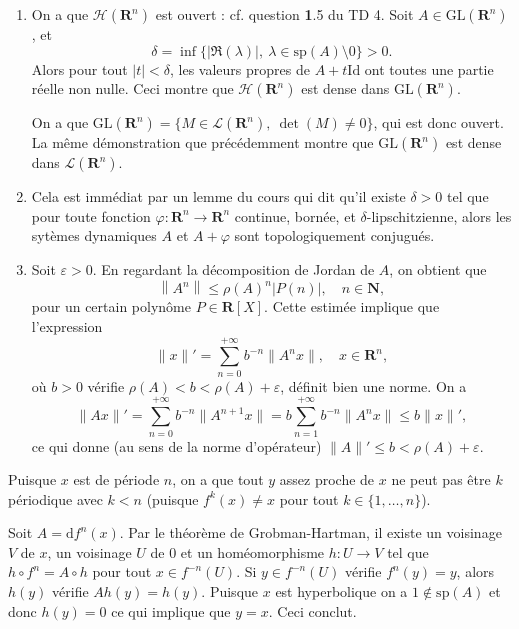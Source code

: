 \documentclass[a4paper,12pt,openany]{article}
\theoremstyle{plain}
\theoremstyle{definition}
\newcommand{\dd}{\mathrm{d}}
\newcommand{\R}{\mathbf{R}}
\newcommand{\N}{\mathbf{N}}
\newcommand{\Id}{\mathrm{Id}}
\begin{document}
\begin{enumerate}

\item On a que $\mathcal{H}(\R^n)$ est ouvert : cf. question \textbf{1}.5 du TD 4. Soit $A \in \mathrm{GL}(\R^n)$, et 
$$
\delta = \inf \{|\Re(\lambda)|,~\lambda \in \mathrm{sp}(A) \setminus 0\} > 0.
$$
Alors pour tout $|t|< \delta$, les valeurs propres de $A + t \Id$ ont toutes une partie r\'eelle non nulle. Ceci montre que $\mathcal{H}(\R^n)$ est dense dans $\mathrm{GL}(\R^n).$

 On a que $\mathrm{GL}(\R^n) = \{M \in \mathcal{L}(\R^n),~\det(M) \neq 0\}$, qui est donc ouvert. La m\^eme d\'emonstration que pr\'ec\'edemment montre que $\mathrm{GL}(\R^n)$ est dense dans $\mathcal{L}(\R^n)$.


\item Cela est imm\'ediat par un lemme du cours qui dit qu'il existe $\delta > 0$ tel que pour toute fonction $\varphi : \R^n \to \R^n$ continue, born\'ee, et $\delta$-lipschitzienne, alors les syt\`emes dynamiques $A$ et $A + \varphi$ sont topologiquement conjugu\'es.


\item Soit $\varepsilon > 0$. En regardant la d\'ecomposition de Jordan de $A$, on obtient que 
$$
\left\|A^n\right\|\leq \rho(A)^n |P(n)|, \quad n \in \N,
$$
pour un certain polyn\^ome $P \in \R[X].$ Cette estim\'ee implique que l'expression
$$
\|x\|' = \sum_{n=0}^{+\infty} b^{-n} \|A^nx\|, \quad x \in \R^n,
$$
o\`u $b>0$ v\'erifie $\rho(A) < b < \rho(A) + \varepsilon$, d\'efinit bien une norme. On a
$$
\|Ax\|' = \sum_{n=0}^{+\infty} b^{-n}\|A^{n+1}x\| = b \sum_{n=1}^{+\infty}b^{-n} \|A^{n}x\| \leq b\|x\|',
$$
ce qui donne (au sens de la norme d'op\'erateur) $\|A\|'\leq b<\rho(A) + \varepsilon$.

\end{enumerate}

\vspace{0.6cm}


\noindent
Puisque $x$ est de p\'eriode $n$, on a que tout $y$ assez proche de $x$ ne peut pas \^etre $k$ p\'eriodique avec $k<n$ (puisque $f^k(x) \neq x$ pour tout $k \in \{1, \dots, n\}$). \vspace{0.2cm}

\noindent Soit $A = \dd f^n(x)$. Par le th\'eor\`eme de Grobman-Hartman, il existe un voisinage $V$ de $x$, un voisinage $U$ de $0$ et un hom\'eomorphisme $h : U \to V$ tel que $h \circ f^n = A \circ h$ pour tout $x \in f^{-n}(U)$. Si $y \in f^{-n}(U)$ v\'erifie $f^n(y) = y$, alors $h(y)$ v\'erifie $Ah(y) = h(y).$ Puisque $x$ est hyperbolique on a $1 \notin \mathrm{sp}(A)$ et donc $h(y) = 0$ ce qui implique que $y = x$. Ceci conclut.
\end{document}
